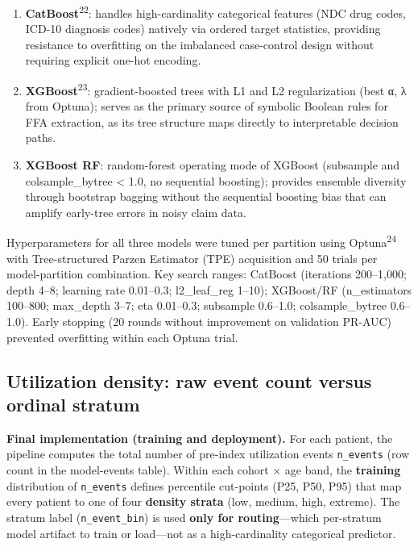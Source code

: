 \documentclass[
  12pt,
]{book}
\providecommand{\tightlist}{%
  \setlength{\itemsep}{0pt}\setlength{\parskip}{0pt}}
\begin{document}
\begin{enumerate}
\def\labelenumi{\arabic{enumi}.}
\tightlist
\item
  \textbf{CatBoost}\textsuperscript{22}: handles high-cardinality
  categorical features (NDC drug codes, ICD-10 diagnosis codes) natively
  via ordered target statistics, providing resistance to overfitting on
  the imbalanced case-control design without requiring explicit one-hot
  encoding.
\item
  \textbf{XGBoost}\textsuperscript{23}: gradient-boosted trees with L1
  and L2 regularization (best α, λ from Optuna); serves as the primary
  source of symbolic Boolean rules for FFA extraction, as its tree
  structure maps directly to interpretable decision paths.
\item
  \textbf{XGBoost RF}: random-forest operating mode of XGBoost
  (subsample and colsample\_bytree \textless{} 1.0, no sequential
  boosting); provides ensemble diversity through bootstrap bagging
  without the sequential boosting bias that can amplify early-tree
  errors in noisy claim data.
\end{enumerate}

Hyperparameters for all three models were tuned per partition using
Optuna\textsuperscript{24} with Tree-structured Parzen Estimator (TPE)
acquisition and 50 trials per model-partition combination. Key search
ranges: CatBoost (iterations 200--1,000; depth 4--8; learning rate
0.01--0.3; l2\_leaf\_reg 1--10); XGBoost/RF (n\_estimators 100--800;
max\_depth 3--7; eta 0.01--0.3; subsample 0.6--1.0; colsample\_bytree
0.6--1.0). Early stopping (20 rounds without improvement on validation
PR-AUC) prevented overfitting within each Optuna trial.

\subsection{Utilization density: raw event count versus ordinal
stratum}\label{sec-density-encoding}

\textbf{Final implementation (training and deployment).} For each
patient, the pipeline computes the total number of pre-index utilization
events \texttt{n\_events} (row count in the model-events table). Within
each cohort \(\times\) age band, the \textbf{training} distribution of
\texttt{n\_events} defines percentile cut-points (P25, P50, P95) that
map every patient to one of four \textbf{density strata} (low, medium,
high, extreme). The stratum label (\texttt{n\_event\_bin}) is used
\textbf{only for routing}---which per-stratum model artifact to train or
load---not as a high-cardinality categorical predictor.
\end{document}

